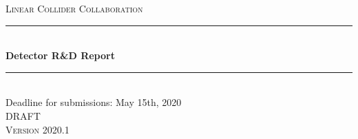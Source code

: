 \documentclass[10pt,final]{report}
\begin{document}
\begin{titlepage} 
    \newcommand{\HRule}{\rule{\linewidth}{0.5mm}} %
	\center %
	
	
	\textsc{\LARGE Linear Collider Collaboration}\\[1.5cm] %
		
	
	
	\HRule\\[0.4cm]
	
	{\huge\bfseries Detector R\&D Report}\\[0.4cm] %
	
	\HRule\\[1.5cm]

	{\Large \color{red}Deadline for submissions: May 15th, 2020}\\
	{\Large DRAFT}\\
    \textsc{Version 2020.1}\\[0.5cm] %


\end{titlepage}
\end{document}
